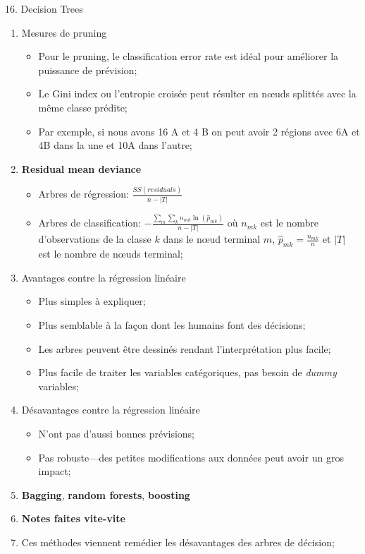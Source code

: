 \documentclass[12pt, titlepage, french]{report}
\begin{document}
\begin{CHPT_SUMM}[label = {DECISION-TREES}]{16. Decision Trees}
\begin{enumerate}
\begin{itemize}
		\end{itemize}
%		
	\item[]	Mesures de pruning
		\begin{itemize}
		\item	Pour le pruning, le classification error rate est idéal pour améliorer la puissance de prévision;
		\item[]	Le Gini index ou l'entropie croisée peut résulter en nœuds splittés avec la même classe prédite;
		\item[]	Par exemple, si nous avons 16 A et 4 B on peut avoir 2 régions avec 6A et 4B dans la une et 10A dans l'autre;
		\end{itemize}
%		
	\item[]	\textbf{Residual mean deviance}
		\begin{itemize}
		\item	Arbres de régression: $\frac{SS(residuals)}{n - |T|}$
		\item	Arbres de classification: $-\frac{\sum_{m}\sum_{k} n_{mk} \ln(\hat{p}_{mk})}{n - |T|}$
		où $n_{mk}$ est le nombre d'observations de la classe $k$ dans le nœud terminal $m$, $\hat{p}_{mk} = \frac{n_{mk}}{n}$ et $|T|$ est le nombre de nœuds terminal;
		\end{itemize}
%
	\item[]	Avantages contre la régression linéaire
		\begin{itemize}
		\item	Plus simples à expliquer;
		\item	Plus semblable à la façon dont les humains font des décisions;
		\item	Les arbres peuvent être dessinés rendant l'interprétation plus facile;
		\item	Plus facile de traiter les variables catégoriques, pas besoin de \textit{dummy} variables;
		\end{itemize}
%		 
	\item[]	Désavantages contre la régression linéaire
		\begin{itemize}
		\item	N'ont pas d'aussi bonnes prévisions;
		\item	Pas robuste---des petites modifications aux données peut avoir un gros impact;
		\end{itemize}
	\item	\textbf{Bagging}, \textbf{random forests}, \textbf{boosting}
	\item[]	\textbf{Notes faites vite-vite}
	\item[]	Ces méthodes viennent remédier les désavantages des arbres de décision;

\end{enumerate}
\end{CHPT_SUMM}
\end{document}
